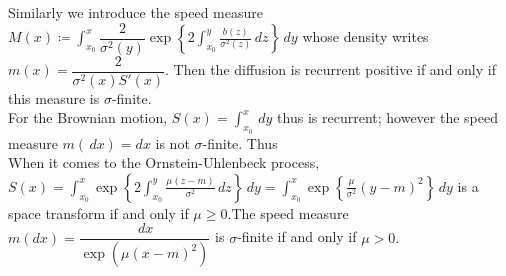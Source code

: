 Similarly we introduce the speed measure $M(x) \coloneqq \displaystyle \int_{x_0}^{x} \dfrac{2}{\sigma^2(y)} \exp\left\{2\displaystyle \int_{x_0}^{y} \frac{b(z)}{\sigma^2(z)} \,dz\right\} \,dy$ whose density writes $m(x)=\dfrac{2}{\sigma^2(x)S'(x)}$. Then the diffusion is recurrent positive if and only if this measure is $\sigma$-finite.\\

For the Brownian motion, $S(x) = \displaystyle \int_{x_0}^{x} \,dy$ thus is recurrent; however the speed measure $m(\,dx) = dx$ is not $\sigma$-finite. Thus \\

When it comes to the Ornstein-Uhlenbeck process, $S(x) = \displaystyle \int_{x_0}^{x} \exp\left\{2\displaystyle \int_{x_0}^{y} \frac{\mu (z-m)}{\sigma^2} \,dz\right\} \,dy = \displaystyle \int_{x_0}^{x} \exp \left\{\frac{\mu}{\sigma^2} (y-m)^2\right\} \,dy$ is a space transform if and only if $\mu \geq 0.$\newline The speed measure $m(dx) = \dfrac{\,dx}{\exp(\mu(x-m)^2)}$ is $\sigma$-finite if and only if $\mu > 0.$